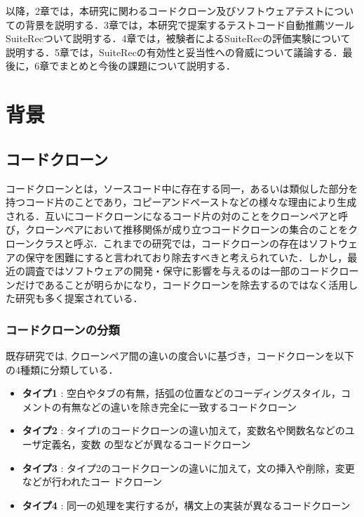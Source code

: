 \documentclass[12pt]{jarticle} %
\begin{document}
以降，2章では，本研究に関わるコードクローン及びソフトウェアテストについての背景を説明する．3章では，本研究で提案するテストコード自動推薦ツール{\sf SuiteRec}ついて説明する．4章では，被験者による{\sf SuiteRec}の評価実験について説明する．5章では，{\sf SuiteRec}の有効性と妥当性への脅威について議論する．最後に，6章でまとめと今後の課題について説明する．


\newpage
\section{背景}
\subsection{コードクローン}

コードクローンとは，ソースコード中に存在する同一，あるいは類似した部分を持つコード片のことであり，コピーアンドペーストなどの様々な理由により生成される\cite{c1}．互いにコードクローンになるコード片の対のことをクローンペアと呼び，クローンペアにおいて推移関係が成り立つコードクローンの集合のことをクローンクラスと呼ぶ．これまでの研究\cite{c2,c3,c1}では，コードクローンの存在はソフトウェアの保守を困難にすると言われており除去すべきと考えられていた．しかし，最近の調査ではソフトウェアの開発・保守に影響を与えるのは一部のコードクローンだけであることが明らかになり，コードクローンを除去するのではなく活用した研究も多く提案されている．

\subsubsection{コードクローンの分類}
既存研究\cite{c5,c4}では,  クローンペア間の違いの度合いに基づき，コードクローンを以下の4種類に分類している．

\begin{itemize}
\item \textbf{タイプ1} : 空白やタブの有無，括弧の位置などのコーディングスタイル，コメントの有無などの違いを除き完全に一致するコードクローン
\item \textbf{タイプ2} : タイプ1のコードクローンの違い加えて，変数名や関数名などのユーザ定義名，変数 の型などが異なるコードクローン
\item \textbf{タイプ3} : タイプ2のコードクローンの違いに加えて，文の挿入や削除，変更などが行われたコー ドクローン
\item \textbf{タイプ4} : 同一の処理を実行するが，構文上の実装が異なるコードクローン
\end{itemize}
\end{document}
